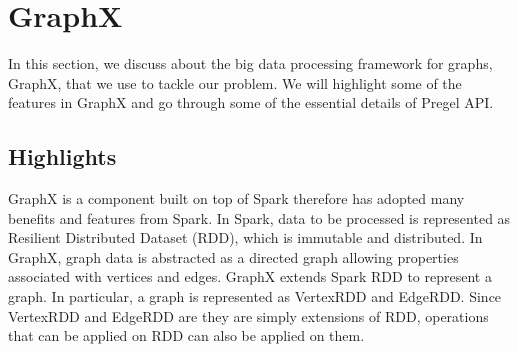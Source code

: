 \section{GraphX}
%
In this section, we discuss about the big data processing framework for graphs, GraphX, that we use to tackle our problem.
%
We will highlight some of the features in GraphX and go through some of the essential details of Pregel API.
%
\subsection{Highlights}
%
GraphX is a component built on top of Spark therefore has adopted many benefits and features from Spark.
%
In Spark, data to be processed is represented as Resilient Distributed Dataset (RDD), which is immutable and distributed.
%
In GraphX, graph data is abstracted as a directed graph allowing properties associated with vertices and edges.
%
GraphX extends Spark RDD to represent a graph.
%
In particular, a graph is represented as VertexRDD and EdgeRDD.
%
Since VertexRDD and EdgeRDD are they are simply extensions of RDD, operations that can be applied on RDD can also be applied on them.
%
